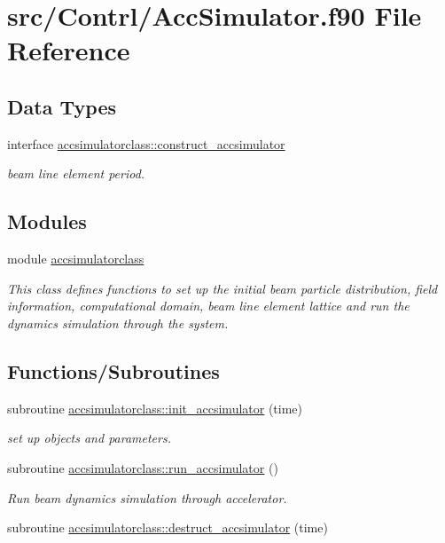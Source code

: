 \hypertarget{_acc_simulator_8f90}{}\section{src/\+Contrl/\+Acc\+Simulator.f90 File Reference}
\label{_acc_simulator_8f90}
\subsection*{Data Types}
\begin{DoxyCompactItemize}
\item 
interface \mbox{\hyperlink{interfaceaccsimulatorclass_1_1construct__accsimulator}{accsimulatorclass\+::construct\+\_\+accsimulator}}
\begin{DoxyCompactList}\small\item\em beam line element period. \end{DoxyCompactList}\end{DoxyCompactItemize}
\subsection*{Modules}
\begin{DoxyCompactItemize}
\item 
module \mbox{\hyperlink{namespaceaccsimulatorclass}{accsimulatorclass}}
\begin{DoxyCompactList}\small\item\em This class defines functions to set up the initial beam particle distribution, field information, computational domain, beam line element lattice and run the dynamics simulation through the system. \end{DoxyCompactList}\end{DoxyCompactItemize}
\subsection*{Functions/\+Subroutines}
\begin{DoxyCompactItemize}
\item 
subroutine \mbox{\hyperlink{namespaceaccsimulatorclass_a6a90186281758191cfa3ef4fc9c54078}{accsimulatorclass\+::init\+\_\+accsimulator}} (time)
\begin{DoxyCompactList}\small\item\em set up objects and parameters. \end{DoxyCompactList}\item 
subroutine \mbox{\hyperlink{namespaceaccsimulatorclass_acbe26eeaf1cb4076384b90e1016785f0}{accsimulatorclass\+::run\+\_\+accsimulator}} ()
\begin{DoxyCompactList}\small\item\em Run beam dynamics simulation through accelerator. \end{DoxyCompactList}\item 
subroutine \mbox{\hyperlink{namespaceaccsimulatorclass_a7bcc6275f447513b2ea5d85d46aade2a}{accsimulatorclass\+::destruct\+\_\+accsimulator}} (time)
\end{DoxyCompactItemize}
